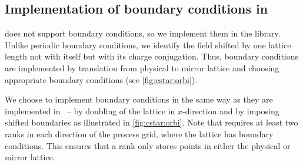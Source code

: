 \subsection{Implementation of \CstarHeading boundary conditions in \quda}
\label{sec:interface:cstar}

\Quda does not support \Cstar boundary conditions, so we implement them in the \quda library.
Unlike periodic boundary conditions, we identify the field shifted by one lattice length not with itself but with its charge conjugation.
Thus, \Cstar boundary conditions are implemented by translation from physical to mirror lattice and choosing appropriate boundary conditions (see \cref{fig:cstar:orbi}).

%   

We choose to implement \Cstar boundary conditions in the same way as they are implemented in \openqxd\ -- by doubling of the lattice in $x$-direction and by imposing shifted boundaries as illustrated in \cref{fig:cstar:orbi}. Note that \openqxd requires at least two ranks in each direction of the process grid, where the lattice has \Cstar boundary conditions. This ensures that a rank only stores points in either the physical or mirror lattice.


